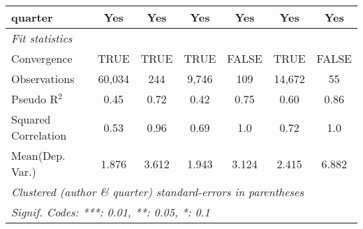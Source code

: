 \begin{tabular}{lcccccc}
   quarter                                                    & Yes           & Yes          & Yes            & Yes           & Yes            & Yes\\  
   \midrule
   \emph{Fit statistics}\\
   Convergence                                                &TRUE           & TRUE         & TRUE           & FALSE         & TRUE           & FALSE\\  
   Observations                                               & 60,034        & 244          & 9,746          & 109           & 14,672         & 55\\  
   Pseudo R$^2$                                               & 0.45          & 0.72         & 0.42           & 0.75          & 0.60           & 0.86\\  
   Squared Correlation                                        & 0.53          & 0.96         & 0.69           & 1.0           & 0.72           & 1.0\\  
Mean(Dep. Var.) & 1.876 & 3.612 & 1.943 & 3.124 & 2.415 & 6.882 \\
   \midrule \midrule
   \multicolumn{7}{l}{\emph{Clustered (author \& quarter) standard-errors in parentheses}}\\
   \multicolumn{7}{l}{\emph{Signif. Codes: ***: 0.01, **: 0.05, *: 0.1}}\\
\end{tabular}
\par\endgroup

